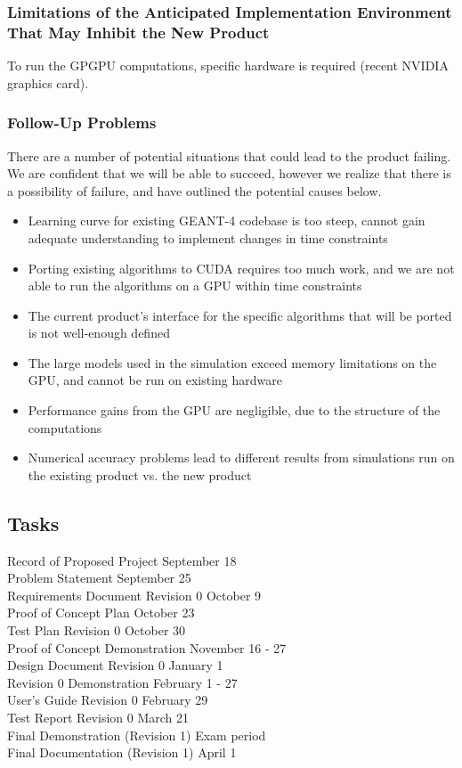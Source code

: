 \documentclass[12pt]{article}
\begin{document}
\subsubsection{Limitations of the Anticipated Implementation Environment That May Inhibit the New Product}
To run the GPGPU computations, specific hardware is required (recent NVIDIA graphics card).

\subsubsection{Follow-Up Problems}
There are a number of potential situations that could lead to the product failing. We are confident that we will be able to succeed, however we realize that there is a possibility of failure, and have outlined the potential causes below.
\begin{itemize}
\item Learning curve for existing GEANT-4 codebase is too steep, cannot gain adequate understanding to implement changes in time constraints
\item Porting existing algorithms to CUDA requires too much work, and we are not able to run the algorithms on a GPU within time constraints
\item The current product's interface for the specific algorithms that will be ported is not well-enough defined
\item The large models used in the simulation exceed memory limitations on the GPU, and cannot be run on existing hardware
\item Performance gains from the GPU are negligible, due to the structure of the computations
\item Numerical accuracy problems lead to different results from simulations run on the existing product vs. the new product
\end{itemize}

\subsection{Tasks}\label{SubSec_Tasks} %
Record of Proposed Project \hfill September 18\\
Problem Statement \hfill September 25\\
Requirements Document Revision 0 \hfill October 9\\
Proof of Concept Plan \hfill October 23\\
Test Plan Revision 0 \hfill October 30\\
Proof of Concept Demonstration \hfill November 16 - 27\\
Design Document Revision 0 \hfill January 1\\
Revision 0 Demonstration \hfill February 1 - 27\\
User's Guide Revision 0 \hfill February 29\\
Test Report Revision 0 \hfill March 21\\
Final Demonstration (Revision 1) \hfill Exam period\\
Final Documentation (Revision 1) \hfill April 1
\end{document}
